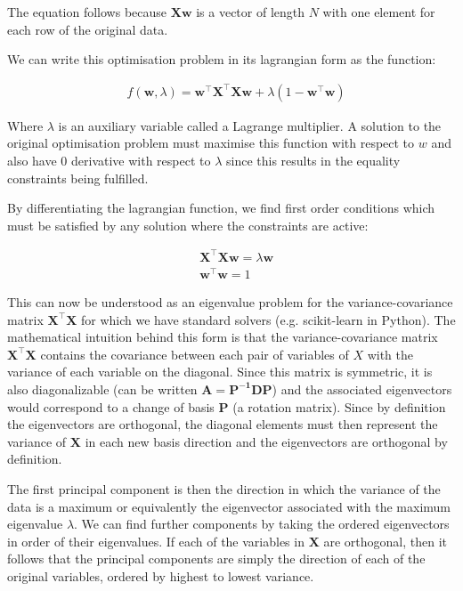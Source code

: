 The equation follows because $\mathbf{Xw}$ is a vector of length $N$ with one element for each row of the original data.

We can write this optimisation problem in its lagrangian form as the function:

\begin{align}
     & f(\mathbf{w},\lambda)=\mathbf{w^{\top}X^{\top}}\mathbf{Xw} + \lambda(1-\mathbf{w^{\top}w})
\end{align}

Where $\lambda$ is an auxiliary variable called a Lagrange multiplier. A solution to the original optimisation problem must maximise this function with respect to $w$ and also have 0 derivative with respect to $\lambda$ since this results in the equality constraints being fulfilled.

By differentiating the lagrangian function, we find first order conditions which must be satisfied by any solution where the constraints are active:

\begin{align}
     & \mathbf{X^{\top}}\mathbf{Xw}=\lambda \mathbf{w} \\
     & \mathbf{w^{\top}w}=1
\end{align}

This can now be understood as an eigenvalue problem for the variance-covariance matrix $\mathbf{X^{\top}X}$ for which we have standard solvers (e.g. scikit-learn in Python\cite{pedregosa2011scikit}). The mathematical intuition behind this form is that the variance-covariance matrix $\mathbf{X^{\top}X}$ contains the covariance between each pair of variables of $X$ with the variance of each variable on the diagonal. Since this matrix is symmetric, it is also diagonalizable (can be written $\mathbf{A=P^{-1}DP}$) and the associated eigenvectors would correspond to a change of basis $\mathbf{P}$ (a rotation matrix). Since by definition the eigenvectors are orthogonal, the diagonal elements must then represent the variance of $\mathbf{X}$ in each new basis direction and the eigenvectors are orthogonal by definition.

The first principal component is then the direction in which the variance of the data is a maximum or equivalently the eigenvector associated with the maximum eigenvalue $\lambda$. We can find further components by taking the ordered eigenvectors in order of their eigenvalues. If each of the variables in $\mathbf{X}$ are orthogonal, then it follows that the principal components are simply the direction of each of the original variables, ordered by highest to lowest variance.

